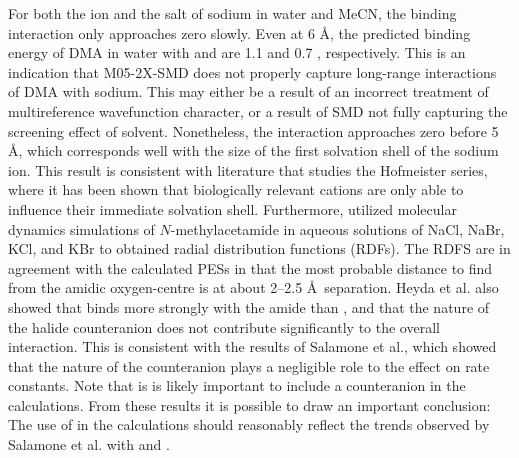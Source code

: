 For both the ion and the salt of sodium in water and MeCN, the binding
interaction only approaches zero slowly. Even at 6 \AA, the predicted binding
energy of DMA in water with  and  are 1.1 and 0.7 \kcalmol,
respectively. This is an indication that M05-2X-SMD does not properly capture
long-range interactions of DMA with sodium. This may either be a result of an
incorrect treatment of multireference wavefunction character, or a result of SMD
not fully capturing the screening effect of solvent. Nonetheless, the
interaction approaches zero before 5 \AA, which corresponds well with the size
of the first solvation shell of the sodium ion.\cite{Degreve1996} This result is
consistent with literature that studies the Hofmeister series, where it has been
shown that biologically relevant cations are only able to influence their
immediate solvation shell.\cite{Omta2003, Funkner2011} Furthermore,
\citet{Heyda2009} utilized molecular dynamics simulations of $N$-methylacetamide
in aqueous solutions of NaCl, NaBr, KCl, and KBr to obtained radial distribution
functions (RDFs). The RDFS are in agreement with the calculated PESs in that the
most probable distance to find  from the amidic oxygen-centre is at
about 2--2.5 \AA\ separation. Heyda et al. also showed that  binds more
strongly with the amide than , and that the nature of the halide
counteranion does not contribute significantly to the overall interaction. This
is consistent with the results of Salamone et al., which showed that the nature
of the counteranion plays a negligible role to the effect on rate
constants.\cite{Salamone2013a} Note that is is likely important to include a
counteranion in the calculations. From these results it is possible to draw an
important conclusion: The use of  in the calculations should reasonably
reflect the trends observed by Salamone et al.  with  and .

